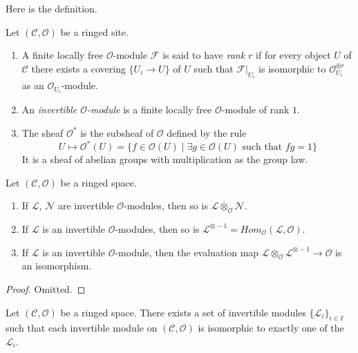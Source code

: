 \noindent
Here is the definition.

\begin{definition}
\label{definition-invertible-sheaf}
Let $(\mathcal{C}, \mathcal{O})$ be a ringed site.
\begin{enumerate}
\item A finite locally free $\mathcal{O}$-module $\mathcal{F}$ is said
to have {\it rank $r$} if for every object $U$ of $\mathcal{C}$ there
exists a covering $\{U_i \to U\}$ of $U$ such that $\mathcal{F}|_{U_i}$
is isomorphic to $\mathcal{O}_{U_i}^{\oplus r}$ as an
$\mathcal{O}_{U_i}$-module.
\item An {\it invertible $\mathcal{O}$-module} is a finite locally
free $\mathcal{O}$-module of rank $1$.
\item The sheaf {\it $\mathcal{O}^*$} is the subsheaf of
$\mathcal{O}$ defined by the rule
$$
U \longmapsto \mathcal{O}^*(U) = \{f \in \mathcal{O}(U) \mid
\exists g \in \mathcal{O}(U)\text{ such that }fg = 1\}
$$
It is a sheaf of abelian groups with multiplication as the group law.
\end{enumerate}
\end{definition}

\begin{lemma}
\label{lemma-constructions-invertible}
Let $(\mathcal{C}, \mathcal{O})$ be a ringed space.
\begin{enumerate}
\item If $\mathcal{L}$, $\mathcal{N}$ are invertible
$\mathcal{O}$-modules, then so is
$\mathcal{L} \otimes_\mathcal{O} \mathcal{N}$.
\item If $\mathcal{L}$ is an invertible
$\mathcal{O}$-modules, then so is
$\mathcal{L}^{\otimes -1}
= \textit{Hom}_\mathcal{O}(\mathcal{L}, \mathcal{O})$.
\item If $\mathcal{L}$ is an invertible
$\mathcal{O}$-module, then the evaluation map
$\mathcal{L} \otimes_\mathcal{O} \mathcal{L}^{\otimes -1}
\to \mathcal{O}$ is an isomorphism.
\end{enumerate}
\end{lemma}

\begin{proof}
Omitted.
\end{proof}

\begin{lemma}
\label{lemma-pic-set}
Let $(\mathcal{C}, \mathcal{O})$ be a ringed space.
There exists a set of invertible modules $\{\mathcal{L}_i\}_{i \in I}$
such that each invertible module on $(\mathcal{C}, \mathcal{O})$
is isomorphic to exactly one of the $\mathcal{L}_i$.
\end{lemma}

